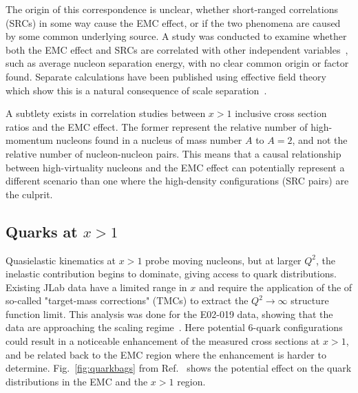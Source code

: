 The origin of this correspondence is unclear, whether short-ranged correlations (SRCs) in some way cause the EMC effect, or if the two
phenomena are caused by some common underlying source.  A study was conducted to examine whether
both the EMC effect and SRCs are correlated with other independent variables~\cite{Arrington:2012ax}, such
as average nucleon separation energy, with no clear common origin or factor found.  Separate calculations have been published using effective field theory which show this is a natural consequence of scale separation~\cite{PhysRevLett.119.262502}.

A subtlety exists in correlation studies between $x>1$ inclusive cross section ratios and the EMC effect. The former represent the relative number of high-momentum nucleons found in a nucleus of mass number $A$ to $A=2$, and not the relative number of nucleon-nucleon pairs.  This means that a causal relationship between high-virtuality nucleons and the EMC effect can potentially represent a different scenario than one where the high-density configurations (SRC pairs) are the culprit.  %


\subsection{Quarks at $x>1$}
Quasielastic kinematics at $x>1$ probe moving nucleons, but at larger $Q^2$, the inelastic contribution begins to dominate, giving access to quark distributions. Existing JLab data have a limited range in $x$ and require the application of the of so-called "target-mass corrections" (TMCs) to extract the $Q^2 \to \infty$ structure function limit.  This analysis was done for the E02-019 data, showing that the data are approaching the scaling regime~\cite{Fomin:2010ei}.  Here potential 6-quark configurations could result in a noticeable enhancement of the measured cross sections at $x>1$, and be related back to the EMC region where the enhancement is harder to determine.  Fig.~\ref{fig:quarkbags} from Ref.~\cite{Arrington:2003qt} shows the potential effect on the quark distributions in the EMC and the $x>1$ region.

